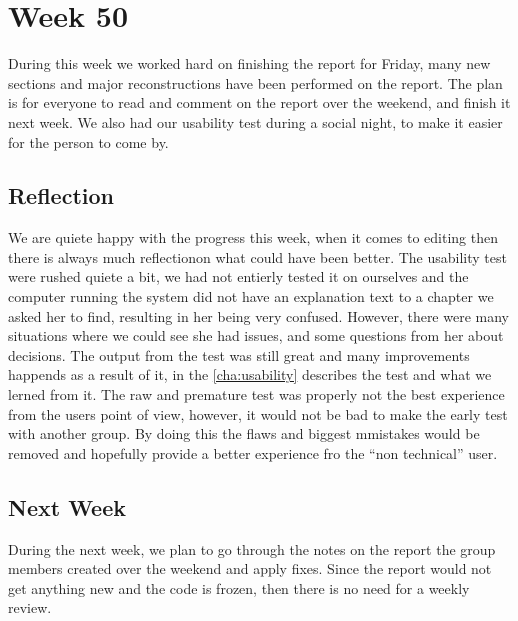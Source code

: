 \section*{Week 50}
During this week we worked hard on finishing the report for Friday, many new
sections and major reconstructions have been performed on the report. The plan
is for everyone to read and comment on the report over the weekend, and finish
it next week. We also had our usability test during a social night, to make it
easier for the person to come by.

\subsection*{Reflection}
We are quiete happy with the progress this week, when it comes to editing then
there is always much reflectionon what could have been better. The usability
test were rushed quiete a bit, we had not entierly tested it on ourselves and
the computer running the system did not have an explanation text to a chapter we
asked her to find, resulting in her being very confused. However, there were
many situations where we could see she had issues, and some questions from her
about decisions. The output from the test was still great and many improvements
happends as a result of it, in the \autoref{cha:usability} describes the test
and what we lerned from it. The raw and premature test was properly not the best
experience from the users point of view, however, it would not be bad to make
the early test with another group. By doing this the flaws and biggest mmistakes
would be removed and hopefully provide a better experience fro the ``non
technical'' user.

\subsection*{Next Week}
During the next week, we plan to go through the notes on the report the group
members created over the weekend and apply fixes. Since the report would not get
anything new and the code is frozen, then there is no need for a weekly review.
